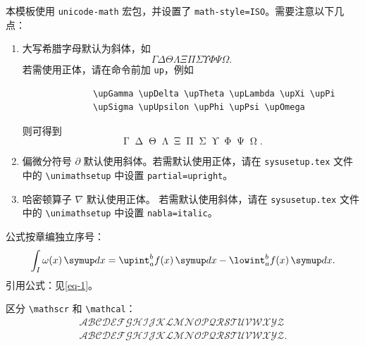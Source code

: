 本模板使用 \verb|unicode-math| 宏包，并设置了 \verb|math-style=ISO|。需要注意以下几点：

\begin{enumerate}
    \item 大写希腊字母默认为斜体，如
          \begin{equation*}
              \Gamma \Delta \Theta \Lambda \Xi \Pi \Sigma \Upsilon \Phi \Psi \Omega.
          \end{equation*}
          若需使用正体，请在命令前加 \verb|up|，例如
          \begin{verbatim}
              \upGamma \upDelta \upTheta \upLambda \upXi \upPi
              \upSigma \upUpsilon \upPhi \upPsi \upOmega
          \end{verbatim}
          则可得到
          \begin{equation*}
              \upGamma \upDelta \upTheta \upLambda \upXi \upPi \upSigma \upUpsilon \upPhi \upPsi \upOmega.
          \end{equation*}
    \item 偏微分符号 $\partial$ 默认使用斜体。若需默认使用正体，请在 \texttt{sysusetup.tex} 文件中的 \verb|\unimathsetup| 中设置 \verb|partial=upright|。
    \item 哈密顿算子 $\nabla$ 默认使用正体。
          若需默认使用斜体，请在 \texttt{sysusetup.tex} 文件中的 \verb|\unimathsetup| 中设置 \verb|nabla=italic|。
\end{enumerate}

公式按章编独立序号：
\begin{equation} \label{eq-1}
    \int_I \omega(x)\diff x = \upint_{a}^b f(x)\diff x - \lowint_a^b f(x)\diff x.
\end{equation}
引用公式：见\autoref{eq-1}。

区分 \verb|\mathscr| 和 \verb|\mathcal|：
\begin{gather*}
    \mathscr{A} \mathscr{B} \mathscr{C} \mathscr{D} \mathscr{E} \mathscr{F} \mathscr{G} \mathscr{H} \mathscr{I} \mathscr{J} \mathscr{K} \mathscr{L} \mathscr{M} \mathscr{N} \mathscr{O} \mathscr{P} \mathscr{Q} \mathscr{R} \mathscr{S} \mathscr{T} \mathscr{U} \mathscr{V} \mathscr{W} \mathscr{X} \mathscr{Y} \mathscr{Z}\\
    \mathcal{A} \mathcal{B} \mathcal{C} \mathcal{D} \mathcal{E} \mathcal{F} \mathcal{G} \mathcal{H} \mathcal{I} \mathcal{J} \mathcal{K} \mathcal{L} \mathcal{M} \mathcal{N} \mathcal{O} \mathcal{P} \mathcal{Q} \mathcal{R} \mathcal{S} \mathcal{T} \mathcal{U} \mathcal{V} \mathcal{W} \mathcal{X} \mathcal{Y} \mathcal{Z}.
\end{gather*}

